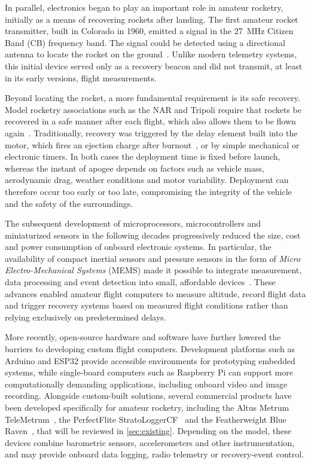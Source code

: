 In parallel, electronics began to play an important role in amateur rocketry, initially as a means of recovering rockets after landing. The first amateur rocket transmitter, built in Colorado in 1960, emitted a signal in the \SI{27}{MHz} Citizen Band (CB) frequency band. The signal could be detected using a directional antenna to locate the rocket on the ground~\cite{rocketryhandbook}. Unlike modern telemetry systems, this initial device served only as a recovery beacon and did not transmit, at least in its early versions, flight measurements.

Beyond locating the rocket, a more fundamental requirement is its safe recovery. Model rocketry associations such as the NAR and Tripoli require that rockets be recovered in a safe manner after each flight, which also allows them to be flown again~\cite{nar:safetycode,tripoli:safetycode}.
Traditionally, recovery was triggered by the delay element built into the motor, which fires an ejection charge after burnout~\cite{rocketryhandbook}, or by simple mechanical or electronic timers. In both cases the deployment time is fixed before launch, whereas the instant of apogee depends on factors such as vehicle mass, aerodynamic drag, weather conditions and motor variability. Deployment can therefore occur too early or too late, compromising the integrity of the vehicle and the safety of the surroundings.

The subsequent development of microprocessors, microcontrollers and miniaturized sensors in the following decades progressively reduced the size, cost and power consumption of onboard electronic systems. In particular, the availability of compact inertial sensors and pressure sensors in the form of \emph{Micro Electro-Mechanical Systems} (MEMS) made it possible to integrate measurement, data processing and event detection into small, affordable devices~\cite{nato:mems}. These advances enabled amateur flight computers to measure altitude, record flight data and trigger recovery systems based on measured flight conditions rather than relying exclusively on predetermined delays.

More recently, open-source hardware and software have further lowered the barriers to developing custom flight computers. Development platforms such as Arduino and ESP32 provide accessible environments for prototyping embedded systems, while single-board computers such as Raspberry Pi can support more computationally demanding applications, including onboard video and image recording. Alongside custom-built solutions, several commercial products have been developed specifically for amateur rocketry, including the Altus Metrum TeleMetrum~\cite{altus:telemetrum}, the PerfectFlite StratoLoggerCF~\cite{perfectflite} and the Featherweight Blue Raven~\cite{featherweight:blueraven}, that will be reviewed in \cref{sec:existing}. Depending on the model, these devices combine barometric sensors, accelerometers and other instrumentation, and may provide onboard data logging, radio telemetry or recovery-event control.

